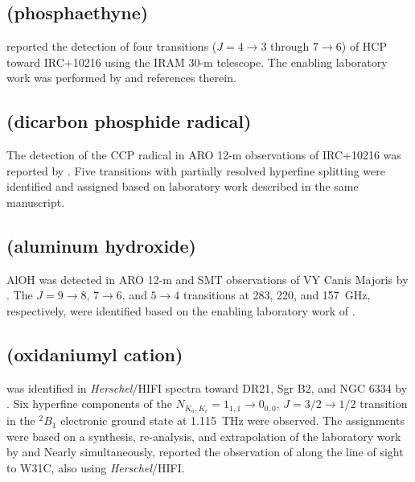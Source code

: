 \documentclass[twocolumn]{aastex631}
\begin{document}
	\subsection{ (phosphaethyne)}
	\label{HCP}
	
	\citet{Agundez:2007ns} reported the detection of four transitions ($J = 4\rightarrow3$ through $7\rightarrow6$) of HCP toward IRC+10216 using the IRAM 30-m telescope.  The enabling laboratory work was performed by \citet{Bizzocchi:2001ij} and references therein.
	
	\subsection{ (dicarbon phosphide radical)}
	\label{CCP}
	
	The detection of the CCP radical in ARO 12-m observations of IRC+10216 was reported by \citet{Halfen:2008dw}.  Five transitions with  partially resolved hyperfine splitting were identified and assigned based on laboratory work described in the same manuscript.
	
	\subsection{ (aluminum hydroxide)}
	\label{AlOH}
	
	AlOH was detected in ARO 12-m and SMT observations of VY Canis Majoris by \citet{Tenenbaum:2010hp}. The $J = 9\rightarrow8$, $7\rightarrow6$, and $5\rightarrow4$ transitions at 283, 220, and 157~GHz, respectively, were identified based on the enabling laboratory work of \citet{Apponi:1993gf}.
	
	\subsection{ (oxidaniumyl cation)}
	\label{H2O+}
	
	 was identified in \emph{Herschel}/HIFI spectra toward DR21, Sgr B2, and NGC 6334 by \citet{Ossenkopf:2010es}.  Six hyperfine components of the $N_{K_a,K_c} = 1_{1,1}\rightarrow0_{0,0}$, $J = 3/2\rightarrow1/2$ transition in the $^2B_1$ electronic ground state at 1.115~THz were observed.  The assignments were based on a synthesis, re-analysis, and extrapolation of the laboratory work by \citet{Strahan:1986du} and \citet{Murtz:1998br}  Nearly simultaneously, \citet{Gerin:2010bg} reported the observation of  along the line of sight to W31C, also using \emph{Herschel}/HIFI.
	
\end{document}
